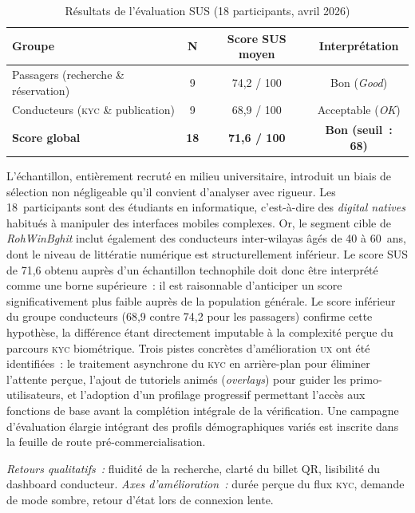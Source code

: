 \begin{table}[H]
\centering
\footnotesize
\begin{tabularx}{\textwidth}{|X|c|c|c|}
\hline
\rowcolor{rohlight}
\textbf{Groupe} & \textbf{N} & \textbf{Score SUS moyen} & \textbf{Interprétation} \\
\hline
Passagers (recherche \& réservation) & 9 & 74,2 / 100 & Bon (\textit{Good}) \\
\hline
Conducteurs (\textsc{kyc} \& publication) & 9 & 68,9 / 100 & Acceptable (\textit{OK}) \\
\hline
\rowcolor{rohlight!20}
\textbf{Score global} & \textbf{18} & \textbf{71,6 / 100} & \textbf{Bon (seuil~: 68)} \\
\hline
\end{tabularx}
  \caption{Résultats de l'évaluation SUS (18 participants, avril 2026)}
  \label{tab:sus}
\end{table}

L'échantillon, entièrement recruté en milieu universitaire, introduit un biais de sélection non négligeable qu'il convient d'analyser avec rigueur. Les 18~participants sont des étudiants en informatique, c'est-à-dire des \textit{digital natives} habitués à manipuler des interfaces mobiles complexes. Or, le segment cible de \textit{RohWinBghit} inclut également des conducteurs inter-wilayas âgés de 40 à 60~ans, dont le niveau de littératie numérique est structurellement inférieur. Le score SUS de 71,6 obtenu auprès d'un échantillon technophile doit donc être interprété comme une borne supérieure~: il est raisonnable d'anticiper un score significativement plus faible auprès de la population générale. Le score inférieur du groupe conducteurs (68,9 contre 74,2 pour les passagers) confirme cette hypothèse, la différence étant directement imputable à la complexité perçue du parcours \textsc{kyc} biométrique. Trois pistes concrètes d'amélioration \textsc{ux} ont été identifiées~: le traitement asynchrone du \textsc{kyc} en arrière-plan pour éliminer l'attente perçue, l'ajout de tutoriels animés (\textit{overlays}) pour guider les primo-utilisateurs, et l'adoption d'un profilage progressif permettant l'accès aux fonctions de base avant la complétion intégrale de la vérification. Une campagne d'évaluation élargie intégrant des profils démographiques variés est inscrite dans la feuille de route pré-commercialisation.

\textit{Retours qualitatifs~:} fluidité de la recherche, clarté du billet QR, lisibilité du dashboard conducteur. \textit{Axes d'amélioration~:} durée perçue du flux \textsc{kyc}, demande de mode sombre, retour d'état lors de connexion lente.

